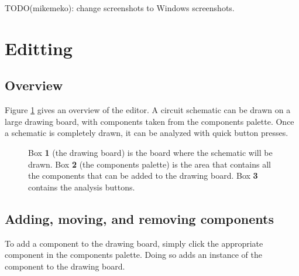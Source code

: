\documentclass[12pt]{amsart}
\begin{document}
TODO(mikemeko): change screenshots to Windows screenshots.

\section{Editting}
\label{sec:editting}

\subsection{Overview}

Figure \ref{fig:overview} gives an overview of the editor. A  circuit schematic can be drawn on a large drawing board, with components taken from the components palette. Once a schematic is completely drawn, it can be analyzed with quick button presses.

\begin{figure}
\caption{Box \textbf{1} (the drawing board) is the board where the schematic will be drawn. Box \textbf{2} (the components palette) is the area that contains all the components that can be added to the drawing board. Box \textbf{3} contains the analysis buttons.}
\label{fig:overview}
\end{figure}

\subsection{Adding, moving, and removing components}

To add a component to the drawing board, simply click the appropriate component in the components palette. Doing so adds an instance of the component to the drawing board.
\end{document}
